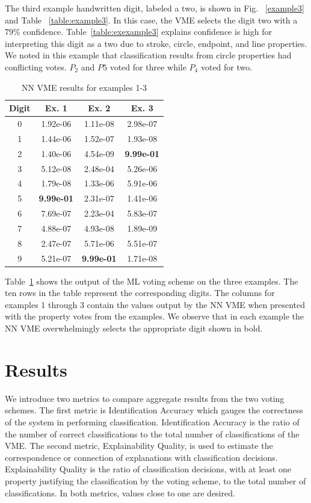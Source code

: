 \documentclass[conference]{IEEEtran}
\begin{document}
The third example handwritten digit, labeled a two, is shown in Fig. ~\ref{example3} and Table ~\ref{table:example3}.  In this case,  the VME selects the digit two with a $79\%$ confidence.  Table~\ref{table:exexample3} explains confidence is high for interpreting this digit as a two due to stroke, circle, endpoint, and line properties.  We noted in this example that classification results from circle properties had conflicting votes.  $P_2$ and $P5$ voted for three while $P_4$ voted for two.

\begin{table}[htbp]
\caption{NN VME results for examples 1-3}
\centering
\begin{tabular}{| c | c | c | c |}
\hline
 Digit & Ex. 1 & Ex. 2 & Ex. 3 \\
\hline\hline
0 & 1.92e-06 & 1.11e-08 & 2.98e-07\\ 
\hline
1 & 1.44e-06 & 1.52e-07 & 1.93e-08 \\
\hline
2 & 1.40e-06 & 4.54e-09 & \textbf{9.99e-01} \\
\hline
3 & 5.12e-08 & 2.48e-04 & 5.26e-06 \\
\hline
4 & 1.79e-08 & 1.33e-06 & 5.91e-06 \\
\hline
5 & \textbf{9.99e-01} & 2.31e-07 & 1.41e-06 \\
\hline
6 & 7.69e-07 & 2.23e-04 & 5.83e-07 \\
\hline
7 & 4.88e-07 & 4.93e-08 & 1.89e-09 \\
\hline
8 & 2.47e-07 & 5.71e-06 & 5.51e-07 \\
\hline
9 & 5.21e-07 & \textbf{9.99e-01} & 1.71e-08 \\
\hline
\end{tabular}
\label{table:nnavoter}
\end{table}

Table~\ref{table:nnavoter} shows the output of the ML voting scheme on the three examples.  The ten rows in the table represent the corresponding digits.  The columns for examples 1 through 3 contain the values output by the NN VME when presented with the property votes from the examples.  We observe that in each example the NN VME overwhelmingly selects the appropriate digit shown in bold.

\section{Results}

We introduce two metrics to compare aggregate results from the two voting schemes.  The first metric is Identification Accuracy which gauges the correctness of the system in performing classification.  Identification Accuracy is the ratio of the number of correct classifications to the total number of classifications of the VME.  The second metric, Explainability Quality, is used to estimate the correspondence or connection of explanations with classification decisions.  Explainability Quality is the ratio of classification decisions, with at least one property justifying the classification by the voting scheme, to the total number of classifications.   In both metrics, values close to one are desired.
\end{document}
